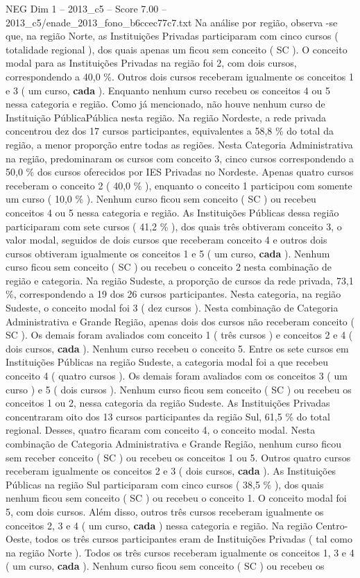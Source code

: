 \begin{textsample}{NEG Dim 1 – 2013\_c5 – Score 7.00 – 2013\_c5/enade\_2013\_fono\_b6ccec77c7.txt}
Na análise por região, observa -se que, na região Norte, as Instituições Privadas participaram com cinco cursos ( totalidade regional ), dos quais apenas um ficou sem conceito ( SC ).
O conceito modal para as Instituições Privadas na região foi 2, com dois cursos, correspondendo a 40,0 \%.
Outros dois cursos receberam igualmente os conceitos 1 e 3 ( um curso, \textbf{cada} ).
Enquanto nenhum curso recebeu os conceitos 4 ou 5 nessa categoria e região.
Como já mencionado, não houve nenhum curso de Instituição PúblicaPública nesta região.
Na região Nordeste, a rede privada concentrou dez dos 17 cursos participantes, equivalentes a 58,8 \% do total da região, a menor proporção entre todas as regiões.
Nesta Categoria Administrativa na região, predominaram os cursos com conceito 3, cinco cursos correspondendo a 50,0 \% dos cursos oferecidos por IES Privadas no Nordeste.
Apenas quatro cursos receberam o conceito 2 ( 40,0 \% ), enquanto o conceito 1 participou com somente um curso ( 10,0 \% ).
Nenhum curso ficou sem conceito ( SC ) ou recebeu conceitos 4 ou 5 nessa categoria e região.
As Instituições Públicas dessa região participaram com sete cursos ( 41,2 \% ), dos quais três obtiveram conceito 3, o valor modal, seguidos de dois cursos que receberam conceito 4 e outros dois cursos obtiveram igualmente os conceitos 1 e 5 ( um curso, \textbf{cada} ).
Nenhum curso ficou sem conceito ( SC ) ou recebeu o conceito 2 nesta combinação de região e categoria.
Na região Sudeste, a proporção de cursos da rede privada, 73,1 \%, correspondendo a 19 dos 26 cursos participantes.
Nesta categoria, na região Sudeste, o conceito modal foi 3 ( dez cursos ).
Nesta combinação de Categoria Administrativa e Grande Região, apenas dois dos cursos não receberam conceito ( SC ).
Os demais foram avaliados com conceito 1 ( três cursos ) e conceitos 2 e 4 ( dois cursos, \textbf{cada} ).
Nenhum curso recebeu o conceito 5.
Entre os sete cursos em Instituições Públicas na região Sudeste, a categoria modal foi a que recebeu conceito 4 ( quatro cursos ).
Os demais foram avaliados com os conceitos 3 ( um curso ) e 5 ( dois cursos ).
Nenhum curso ficou sem conceito ( SC ) ou recebeu os conceitos 1 ou 2, nessa categoria da região Sudeste.
As Instituições Privadas concentraram oito dos 13 cursos participantes da região Sul, 61,5 \% do total regional.
Desses, quatro ficaram com conceito 4, o conceito modal.
Nesta combinação de Categoria Administrativa e Grande Região, nenhum curso ficou sem receber conceito ( SC ) ou recebeu os conceitos 1 ou 5.
Outros quatro cursos receberam igualmente os conceitos 2 e 3 ( dois cursos, \textbf{cada} ).
As Instituições Públicas na região Sul participaram com cinco cursos ( 38,5 \% ), dos quais nenhum ficou sem conceito ( SC ) ou recebeu o conceito 1.
O conceito modal foi 5, com dois cursos.
Além disso, outros três cursos receberam igualmente os conceitos 2, 3 e 4 ( um curso, \textbf{cada} ) nessa categoria e região.
Na região Centro-Oeste, todos os três cursos participantes eram de Instituições Privadas ( tal como na região Norte ).
Todos os três cursos receberam igualmente os conceitos 1, 3 e 4 ( um curso, \textbf{cada} ).
Nenhum curso ficou sem conceito ( SC ) ou recebeu os

\end{textsample}
